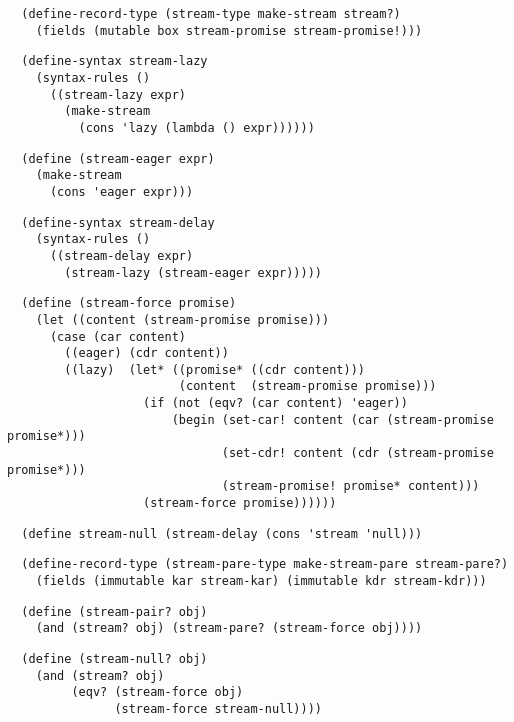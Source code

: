 \begin{verbatim}
  (define-record-type (stream-type make-stream stream?)
    (fields (mutable box stream-promise stream-promise!)))
\end{verbatim}

\begin{verbatim}
  (define-syntax stream-lazy
    (syntax-rules ()
      ((stream-lazy expr)
        (make-stream
          (cons 'lazy (lambda () expr))))))
\end{verbatim}

\begin{verbatim}
  (define (stream-eager expr)
    (make-stream
      (cons 'eager expr)))
\end{verbatim}

\begin{verbatim}
  (define-syntax stream-delay
    (syntax-rules ()
      ((stream-delay expr)
        (stream-lazy (stream-eager expr)))))
\end{verbatim}

\begin{verbatim}
  (define (stream-force promise)
    (let ((content (stream-promise promise)))
      (case (car content)
        ((eager) (cdr content))
        ((lazy)  (let* ((promise* ((cdr content)))
                        (content  (stream-promise promise)))
                   (if (not (eqv? (car content) 'eager))
                       (begin (set-car! content (car (stream-promise promise*)))
                              (set-cdr! content (cdr (stream-promise promise*)))
                              (stream-promise! promise* content)))
                   (stream-force promise))))))
\end{verbatim}

\begin{verbatim}
  (define stream-null (stream-delay (cons 'stream 'null)))
\end{verbatim}

\begin{verbatim}
  (define-record-type (stream-pare-type make-stream-pare stream-pare?)
    (fields (immutable kar stream-kar) (immutable kdr stream-kdr)))
\end{verbatim}

\begin{verbatim}
  (define (stream-pair? obj)
    (and (stream? obj) (stream-pare? (stream-force obj))))
\end{verbatim}

\begin{verbatim}
  (define (stream-null? obj)
    (and (stream? obj)
         (eqv? (stream-force obj)
               (stream-force stream-null))))
\end{verbatim}

